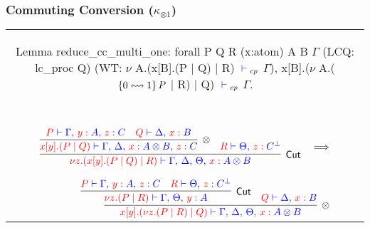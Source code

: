 \documentclass{beamer}
\let\oldframetitle\frametitle
\renewcommand{\frametitle}[1]{
  \oldframetitle{#1}\vspace{-3.5cm}
}
\begin{document}
\begin{frame}[fragile]
\oldframetitle{Commuting Conversion ($\kappa_{\otimes1}$)}
\begin{tabular}{c}
\begin{coq}
Lemma reduce_cc_multi_one:
  forall P Q R (x:atom) A B $\Gamma$ (LCQ: lc_proc Q)
         (WT: $\nu$ A.(x[B].(P $\mid$ Q) $\mid$ R) ${\color{blue} {} \vdash {}}_{cp}$ $\Gamma$),
    x[B].($\nu$ A.($\left\{{0}\leftrightsquigarrow{1}\right\}{P}$ $\mid$ R) $\mid$ Q) ${\color{blue} {} \vdash {}}_{cp}$ $\Gamma$.
\end{coq}
\\~\\
\begin{math}
\colored
\begin{array}{c}

\vcenter{
  \inference{
    \inference{
      \tm{P} \tpvdash \tp{\Gamma \comma \tmof{y}A \comma \tmof{z}C}
      &
      \tm{Q} \tpvdash \tp{\Delta \comma \tmof{x}B}
    }{\otimes}{
      \tm{x[y].(P \mid Q)} \tpvdash
        \tp{\Gamma \comma \Delta \comma \tmof{x}A \otimes B \comma \tmof{z}C}
    }
    &
    \tm{R} \tpvdash \tp{\Theta \comma \tmof{z}C^\bot}
  }{Cut}{
    \tm{\nu z\Of{C}.(x[y].(P \mid Q) \mid R)} \tpvdash
      \tp{\Gamma \comma \Delta \comma \Theta \comma \tmof{x}A \otimes B}
  }
}
\quad \becomes \hfill \\~\\
\hfill
\vcenter{
  \inference{
    \inference{
      \tm{P} \tpvdash \tp{\Gamma \comma \tmof{y}A \comma \tmof{z}C}
      &
      \tm{R} \tpvdash \tp{\Theta \comma \tmof{z}C^\bot}
    }{Cut}{
      \tm{\nu z\Of{C}.(P \mid R)} \tpvdash
        \tp{\Gamma \comma \Theta \comma \tmof{y}A}
    }
    &
    \tm{Q} \tpvdash \tp{\Delta \comma \tmof{x}B}
  }{\otimes}{
    \tm{x[y].(\nu z\Of{C}.(P \mid R) \mid Q)} \tpvdash
      \tp{\Gamma \comma \Delta \comma \Theta \comma \tmof{x}A \otimes B}
  }
}

\end{array}
\end{math}
\end{tabular}
\end{frame}
\end{document}
